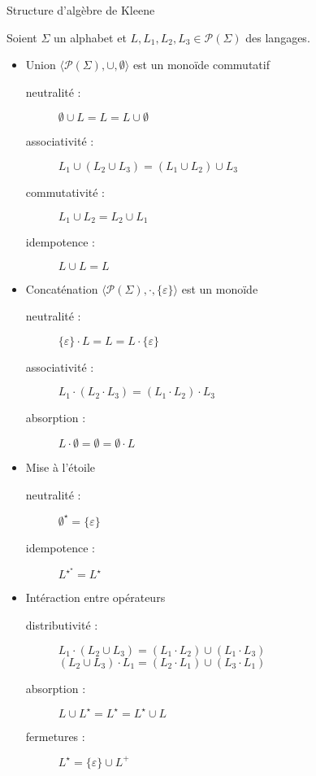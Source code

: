 
\begingroup

\begin{frame}{Structure d'algèbre de Kleene}

  Soient $\Sigma$ un alphabet et $L, L_1, L_2, L_3 \in \mathscr{P}(\Sigma)$ des langages. 
  
  \begin{itemize}
  \item Union \hspace{\fill} $\langle \mathscr{P}(\Sigma), \cup, \emptyset \rangle$ est un monoïde commutatif
    \begin{description}
    \item[neutralité :] $\emptyset \cup L = L = L \cup \emptyset$ 
    \item[associativité :] $L_1 \cup (L_2 \cup L_3) = (L_1 \cup L_2) \cup L_3$
    \item[commutativité :] $L_1 \cup L_2 = L_2 \cup L_1$
    \item[idempotence :] $L \cup L = L$
    \end{description}
  \item Concaténation \hspace{\fill} $\langle \mathscr{P}(\Sigma), \cdot, \{\varepsilon\} \rangle$ est un monoïde
    \begin{description}
    \item[neutralité :] $\{\varepsilon\} \cdot L = L = L \cdot \{\varepsilon\}$
    \item[associativité :] $L_1 \cdot (L_2 \cdot L_3) = (L_1 \cdot L_2) \cdot L_3$
    \item[absorption :] $L \cdot \emptyset = \emptyset = \emptyset \cdot L$
    \end{description}
  \item Mise à l'étoile
    \begin{description}
    \item[neutralité :] $\emptyset^\star = \{\varepsilon\}$
    \item[idempotence :] $L^{\star^\star} = L^\star$
    \end{description}
  \item Intéraction entre opérateurs 
    \begin{description}
    \item[distributivité :] $L_1 \cdot (L_2 \cup L_3) = (L_1\cdot L_2) \cup (L_1 \cdot L_3)$\\
      $(L_2 \cup L_3) \cdot L_1 = (L_2\cdot L_1) \cup (L_3 \cdot L_1)$
    \item[absorption :] $L \cup L^\star = L^\star = L^\star \cup L$
    \item[fermetures :] $L^\star = \{ \varepsilon \} \cup L^+$
    \end{description}
  \end{itemize}

\end{frame}

\endgroup
